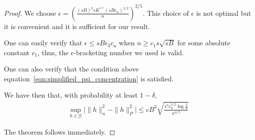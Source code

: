 \begin{proof}
We choose $\epsilon = \left( \frac{ (sB)^2 sK^{**} (sBc_u)^{1/2}}{n} \right)^{2/5}$. This choice of $\epsilon$ is not optimal but it is convenient and it is sufficient for our result.

One can easily verify that $\epsilon \leq sB \epsilon_3 c_u$ when $n \geq c_1 s \sqrt{sB}$ for some absolute constant $c_1$, thus, the $\epsilon$-bracketing number we used is valid. 

One can also verify that the condition above equation~\ref{eqn:simplified_psi_concentration} is satisfied. 

We have then that, with probability at least $1-\delta$,
\begin{align*}
\sup_{h \in \mathcal{G}} \big| \| h \|_n^2 - \| h \|_P^2  \big| \leq
  c B^3 \sqrt{ \frac{s^5 c_u^{1/2} \log \frac{2}{\delta}}{n^{4/5}}}
\end{align*}

The theorem follows immediately.







\end{proof}
